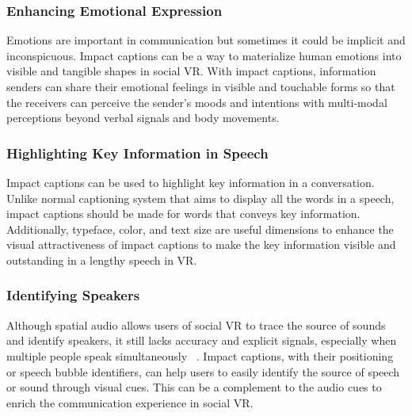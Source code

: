 \subsubsection{Enhancing Emotional Expression}
Emotions are important in communication but sometimes it could be implicit and inconspicuous. Impact captions can be a way to materialize human emotions into visible and tangible shapes in social VR. With impact captions, information senders can share their emotional feelings in visible and touchable forms so that the receivers can perceive the sender's moods and intentions with multi-modal perceptions beyond verbal signals and body movements.

\subsubsection{Highlighting Key Information in Speech}
Impact captions can be used to highlight key information in a conversation. Unlike normal captioning system that aims to display all the words in a speech, impact captions should be made for words that conveys key information.
Additionally, typeface, color, and text size are useful dimensions to enhance the visual attractiveness of impact captions to make the key information visible and outstanding in a lengthy speech in VR.


\subsubsection{Identifying Speakers}
Although spatial audio allows users of social VR to trace the source of sounds and identify speakers, it still lacks accuracy and explicit signals, especially when multiple people speak simultaneously ~\cite{yan2023conespeech}.
Impact captions, with their positioning or speech bubble identifiers, can help users to easily identify the source of speech or sound through visual cues. This can be a complement to the audio cues to enrich the communication experience in social VR.

